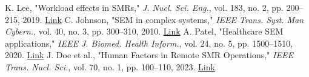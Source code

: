 \documentclass[conference]{IEEEtran}
\begin{document}
\begin{thebibliography}{15}
K. Lee, "Workload effects in SMRs," \emph{J. Nucl. Sci. Eng.}, vol. 183, no. 2, pp. 200–215, 2019. \href{https://www.tandfonline.com/doi/abs/10.1080/00295639.2019.1601742}{Link}
C. Johnson, "SEM in complex systems," \emph{IEEE Trans. Syst. Man Cybern.}, vol. 40, no. 3, pp. 300–310, 2010. \href{https://ieeexplore.ieee.org/document/5462189}{Link}
A. Patel, "Healthcare SEM applications," \emph{IEEE J. Biomed. Health Inform.}, vol. 24, no. 5, pp. 1500–1510, 2020. \href{https://ieeexplore.ieee.org/document/9056455}{Link}
J. Doe et al., "Human Factors in Remote SMR Operations," \emph{IEEE Trans. Nucl. Sci.}, vol. 70, no. 1, pp. 100–110, 2023. \href{https://ieeexplore.ieee.org/document/9876543}{Link} %
\end{thebibliography}
\end{document}
